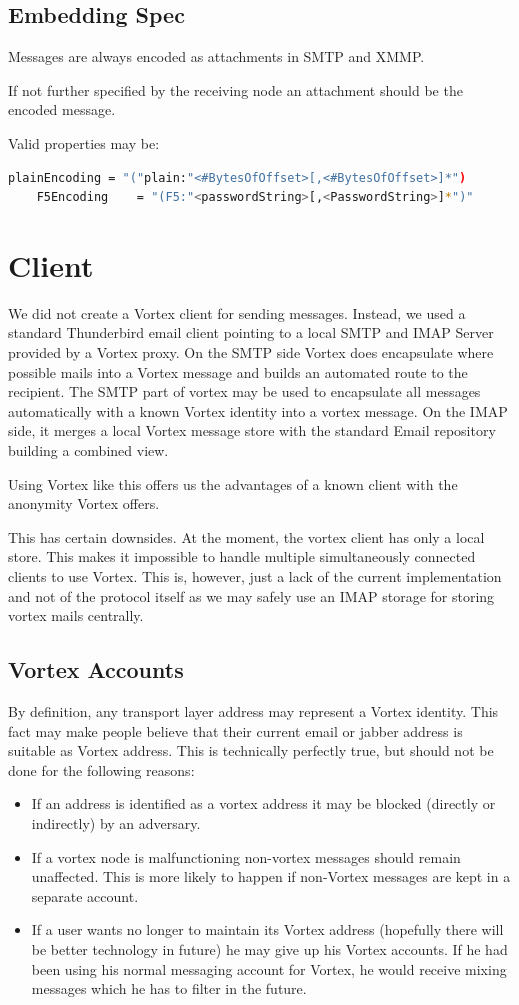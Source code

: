 \subsection{Embedding Spec}
Messages are always encoded as attachments in SMTP and XMMP. 

If not further specified by the receiving node an attachment should be the encoded message. 

Valid properties may be:
\begin{lstlisting}[language=bash]
	plainEncoding = "("plain:"<#BytesOfOffset>[,<#BytesOfOffset>]*")
	F5Encoding    = "(F5:"<passwordString>[,<PasswordString>]*")"
\end{lstlisting}

\section{Client}
We did not create a Vortex client for sending messages. Instead, we used a standard Thunderbird email client pointing to a local SMTP and IMAP Server provided by a Vortex proxy. On the SMTP side Vortex does encapsulate where possible mails into a Vortex message and builds an automated route to the recipient. The SMTP part of vortex may be used to encapsulate all messages automatically with a known Vortex identity into a vortex message. On the IMAP side, it merges a local Vortex message store with the standard Email repository building a combined view.

Using Vortex like this offers us the advantages of a known client with the anonymity Vortex offers.

This has certain downsides. At the moment, the vortex client has only a local store. This makes it impossible to handle multiple simultaneously connected clients to use Vortex. This is, however, just a lack of the current implementation and not of the protocol itself as we may safely use an IMAP storage for storing vortex mails centrally.

\subsection{Vortex Accounts}
By definition, any transport layer address may represent a Vortex identity. This fact may make people believe that their current email or jabber address is suitable as Vortex address. This is technically perfectly true, but should not be done for the following reasons:

\begin{itemize}
	\item If an address is identified as a vortex address it may be blocked (directly or indirectly) by an adversary.
	\item If a vortex node is malfunctioning non-vortex messages should remain unaffected. This is more likely to happen if non-Vortex messages are kept in a separate account.
	\item If a user wants no longer to maintain its Vortex address (hopefully there will be better technology in future) he may give up his Vortex accounts. If he had been using his normal messaging account for Vortex, he would receive mixing messages which he has to filter in the future.
\end{itemize}

